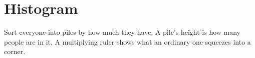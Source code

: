 \section{Histogram}

Sort everyone into piles by how much they have.
A pile's height is how many people are in it.
A multiplying ruler shows what an ordinary one squeezes into a corner.

\begin{figure}
\end{figure}
